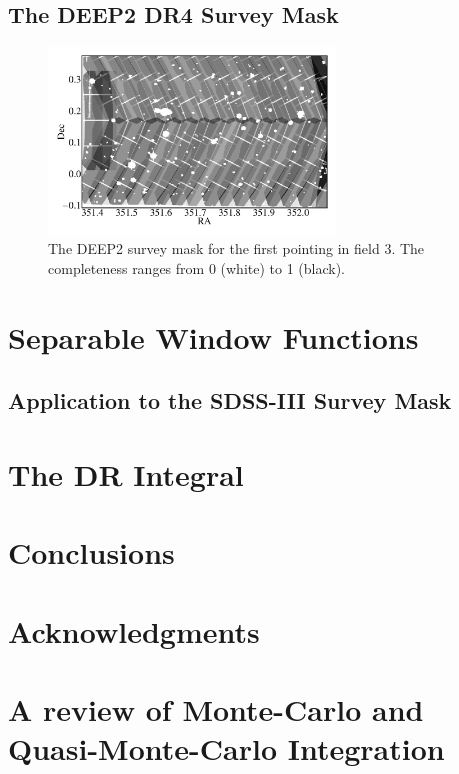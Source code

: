 \documentclass[usenatbib]{mn2e}
\begin{document}
\subsection{The DEEP2 DR4 Survey Mask}

\begin{figure}
\includegraphics[width=3in]{plots/deep2mask}
\caption{The DEEP2 survey mask for the first pointing in field 3. The
completeness ranges from 0 (white) to 1 (black). }
\label{fig:deep2mask}
\end{figure}



\section{Separable Window Functions}
\label{sec:sep}

\subsection{Application to the SDSS-III Survey Mask}

\section{The DR Integral}
\label{sec:DR}

\section{Conclusions}
\label{sec:conclude}


\section{Acknowledgments}

\appendix

\section{A review of Monte-Carlo and Quasi-Monte-Carlo Integration}
\label{sec:review}
\end{document}
